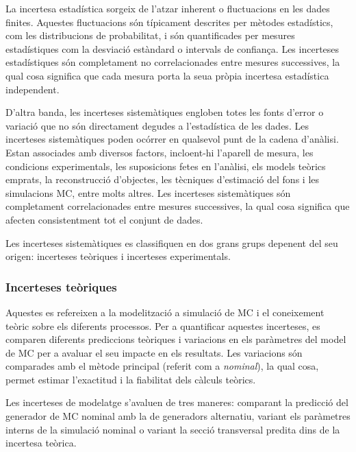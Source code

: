 La incertesa estadística sorgeix de l'atzar inherent o fluctuacions en les dades finites. Aquestes fluctuacions són 
típicament descrites per mètodes estadístics, com les distribucions de probabilitat, i són quantificades per mesures 
estadístiques com la desviació estàndard o intervals de confiança. Les incerteses estadístiques són completament 
no correlacionades entre mesures successives, la qual cosa significa que cada mesura porta la seua pròpia incertesa 
estadística independent.

D'altra banda, les incerteses sistemàtiques engloben totes les fonts d'error o variació que no són directament degudes 
a l'estadística de les dades. Les incerteses sistemàtiques poden ocórrer en qualsevol punt de la cadena d'anàlisi. 
Estan associades amb diversos factors, incloent-hi l'aparell de mesura, les condicions experimentals, les suposicions 
fetes en l'anàlisi, els models teòrics emprats, la reconstrucció d'objectes, les tècniques d'estimació del fons i les 
simulacions MC, entre molts altres. Les incerteses sistemàtiques són completament correlacionades entre mesures 
successives, la qual cosa significa que afecten consistentment tot el conjunt de dades.

Les incerteses sistemàtiques es classifiquen en dos grans grups depenent del seu origen: incerteses teòriques 
i incerteses experimentals.



\subsubsection{Incerteses teòriques}
\label{sec:resum:Incerteses:teo}

Aquestes es refereixen a la modelització a simulació de MC i el coneixement teòric sobre els diferents processos.
Per a quantificar aquestes incerteses, es comparen diferents prediccions teòriques i variacions en els paràmetres 
del model de MC per a avaluar el seu impacte en els resultats. Les variacions són comparades amb el mètode 
principal (referit com a \textit{nominal}), la qual cosa, permet estimar l'exactitud i la fiabilitat dels càlculs teòrics.

Les incerteses de modelatge s'avaluen de tres maneres: comparant la predicció del generador de MC nominal 
amb la de generadors alternatiu, variant els paràmetres interns de la simulació nominal o variant la secció transversal 
predita dins de la incertesa teòrica. 


